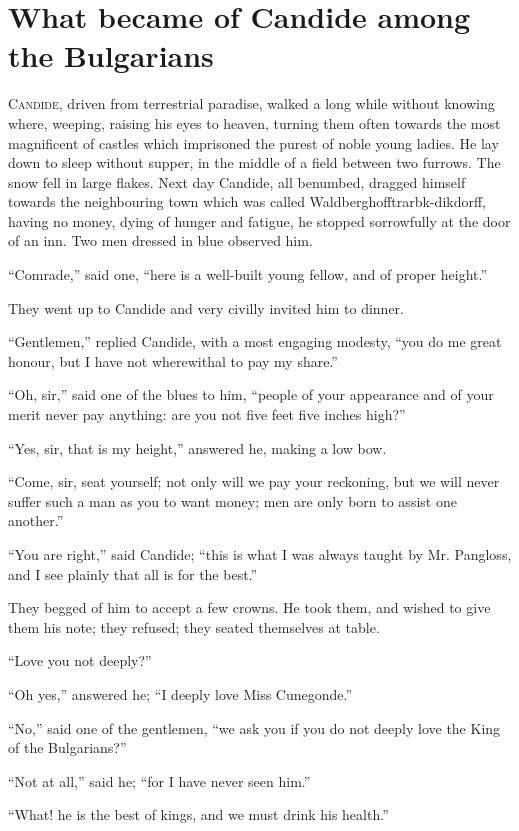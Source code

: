 \chapter{What became of Candide among the Bulgarians}
\lettrine[lraise=0.1,nindent=0em,slope=-.5em]{ C}{andide}, driven from terrestrial paradise, walked a long while without knowing where, weeping, raising his eyes to heaven, turning them often towards the most magnificent of castles which imprisoned the purest of noble young ladies. He lay down to sleep without supper, in the middle of a field between two furrows. The snow fell in large flakes. Next day Candide, all benumbed, dragged himself towards the neighbouring town which was called Waldberghofftrarbk-dikdorff, having no money, dying of hunger and fatigue, he stopped sorrowfully at the door of an inn. Two men dressed in blue observed him.

``Comrade,'' said one, ``here is a well-built young fellow, and of proper height.''

They went up to Candide and very civilly invited him to dinner.

``Gentlemen,'' replied Candide, with a most engaging modesty, ``you do me great honour, but I have not wherewithal to pay my share.''

``Oh, sir,'' said one of the blues to him, ``people of your appearance and of your merit never pay anything: are you not five feet five inches high?''

``Yes, sir, that is my height,'' answered he, making a low bow.

``Come, sir, seat yourself; not only will we pay your reckoning, but we will never suffer such a man as you to want money; men are only born to assist one another.''

``You are right,'' said Candide; ``this is what I was always taught by Mr. Pangloss, and I see plainly that all is for the best.''

They begged of him to accept a few crowns. He took them, and wished to give them his note; they refused; they seated themselves at table.

``Love you not deeply?''

``Oh yes,'' answered he; ``I deeply love Miss Cunegonde.''

``No,'' said one of the gentlemen, ``we ask you if you do not deeply love the King of the Bulgarians?''

``Not at all,'' said he; ``for I have never seen him.''

``What! he is the best of kings, and we must drink his health.''


